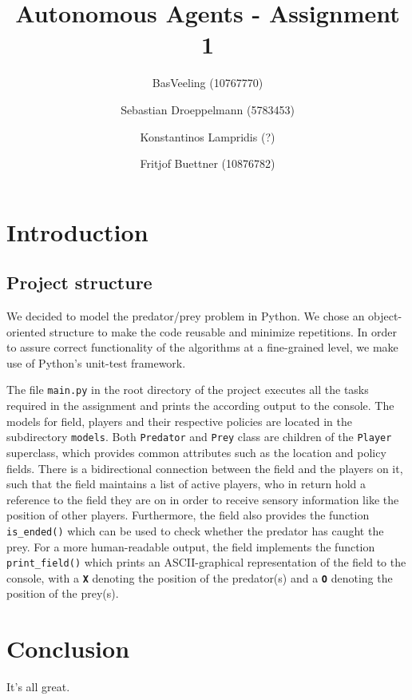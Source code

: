\documentclass[11pt,a4paper]{article}
\begin{document}
\title{Autonomous Agents - Assignment 1}
\author{BasVeeling (10767770) \\ \and Sebastian Droeppelmann (5783453) \\ \and Konstantinos Lampridis (?) \\ \and Fritjof Buettner (10876782)}
\maketitle
\section{Introduction}
\subsection{Project structure}
We decided to model the predator/prey problem in Python. We chose an object-oriented structure to make the code reusable and minimize repetitions. In order to assure correct functionality of the algorithms at a fine-grained level, we make use of Python's unit-test framework.

The file \texttt{main.py} in the root directory of the project executes all the tasks required in the assignment and prints the according output to the console. The models for field, players and their respective policies are located in the subdirectory \texttt{models}. Both \texttt{Predator} and \texttt{Prey} class are children of the \texttt{Player} superclass, which provides common attributes such as the location and policy fields. 
There is a bidirectional connection between the field and the players on it, such that the field maintains a list of active players, who in return hold a reference to the field they are on in order to receive sensory information like the position of other players. 
Furthermore, the field also provides the function \texttt{is\_ended()} which can be used to check whether the predator has caught the prey. 
For a more human-readable output, the field implements the function \texttt{print\_field()} which prints an ASCII-graphical representation of the field to the console, with a \textbf{\texttt{X}} denoting the position of the predator(s) and a \textbf{\texttt{O}} denoting the position of the prey(s).

\section{Conclusion}
It's all great.
\end{document}

